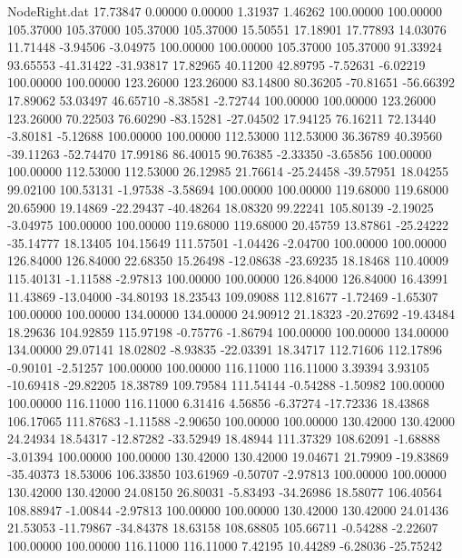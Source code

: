 \begin{filecontents}{NodeRight.dat}
  17.73847    0.00000    0.00000     1.31937    1.46262  100.00000  100.00000  105.37000  105.37000  105.37000  105.37000   15.50551   17.18901
  17.77893   14.03076   11.71448    -3.94506   -3.04975  100.00000  100.00000  105.37000  105.37000   91.33924   93.65553  -41.31422  -31.93817
  17.82965   40.11200   42.89795    -7.52631   -6.02219  100.00000  100.00000  123.26000  123.26000   83.14800   80.36205  -70.81651  -56.66392
  17.89062   53.03497   46.65710    -8.38581   -2.72744  100.00000  100.00000  123.26000  123.26000   70.22503   76.60290  -83.15281  -27.04502
  17.94125   76.16211   72.13440    -3.80181   -5.12688  100.00000  100.00000  112.53000  112.53000   36.36789   40.39560  -39.11263  -52.74470
  17.99186   86.40015   90.76385    -2.33350   -3.65856  100.00000  100.00000  112.53000  112.53000   26.12985   21.76614  -25.24458  -39.57951
  18.04255   99.02100  100.53131    -1.97538   -3.58694  100.00000  100.00000  119.68000  119.68000   20.65900   19.14869  -22.29437  -40.48264
  18.08320   99.22241  105.80139    -2.19025   -3.04975  100.00000  100.00000  119.68000  119.68000   20.45759   13.87861  -25.24222  -35.14777
  18.13405  104.15649  111.57501    -1.04426   -2.04700  100.00000  100.00000  126.84000  126.84000   22.68350   15.26498  -12.08638  -23.69235
  18.18468  110.40009  115.40131    -1.11588   -2.97813  100.00000  100.00000  126.84000  126.84000   16.43991   11.43869  -13.04000  -34.80193
  18.23543  109.09088  112.81677    -1.72469   -1.65307  100.00000  100.00000  134.00000  134.00000   24.90912   21.18323  -20.27692  -19.43484
  18.29636  104.92859  115.97198    -0.75776   -1.86794  100.00000  100.00000  134.00000  134.00000   29.07141   18.02802   -8.93835  -22.03391
  18.34717  112.71606  112.17896    -0.90101   -2.51257  100.00000  100.00000  116.11000  116.11000    3.39394    3.93105  -10.69418  -29.82205
  18.38789  109.79584  111.54144    -0.54288   -1.50982  100.00000  100.00000  116.11000  116.11000    6.31416    4.56856   -6.37274  -17.72336
  18.43868  106.17065  111.87683    -1.11588   -2.90650  100.00000  100.00000  130.42000  130.42000   24.24934   18.54317  -12.87282  -33.52949
  18.48944  111.37329  108.62091    -1.68888   -3.01394  100.00000  100.00000  130.42000  130.42000   19.04671   21.79909  -19.83869  -35.40373
  18.53006  106.33850  103.61969    -0.50707   -2.97813  100.00000  100.00000  130.42000  130.42000   24.08150   26.80031   -5.83493  -34.26986
  18.58077  106.40564  108.88947    -1.00844   -2.97813  100.00000  100.00000  130.42000  130.42000   24.01436   21.53053  -11.79867  -34.84378
  18.63158  108.68805  105.66711    -0.54288   -2.22607  100.00000  100.00000  116.11000  116.11000    7.42195   10.44289   -6.28036  -25.75242

\end{filecontents}
